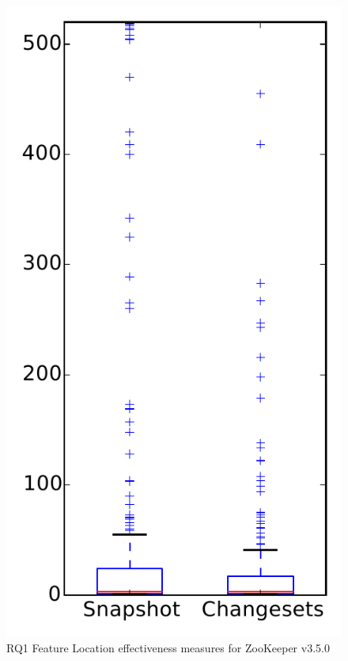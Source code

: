 
\begin{figure}
\centering
\includegraphics[height=0.4\textheight]{figures/flt/rq1_zookeeper}
\caption{RQ1 Feature Location effectiveness measures for ZooKeeper v3.5.0}
\label{fig:flt:rq1:zookeeper}
\end{figure}

